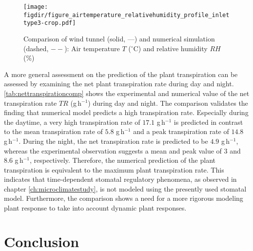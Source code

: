 \begin{figure}[t]
	\centering
	\texttt{[image: \\figdir/figure\_airtemperature\_relativehumidity\_profile\_inlettype3-crop.pdf]}
	\caption{Comparison of wind tunnel (solid, ---) and numerical simulation (dashed, $--$):  Air temperature $T$ ($^{\circ}$C) and  relative humidity $\mathit{RH}$ (\%)}
	\label{fig:figure_airtemperature_relativehumidity_profile2}
\end{figure}

A more general assessment on the prediction of the plant transpiration can be assessed by examining the net plant transpiration rate during day and night. \cref{tab:nettranspirationcomp} shows the experimental and numerical value of the net transpiration rate $\textit{TR}$ (g\,h$^{-1}$) during day and night. The comparison validates the finding that numerical model predicts a high transpiration rate. Especially during the daytime, a very high transpiration rate of $17.1$ g\,h$^{-1}$ is predicted in contrast to the mean transpiration rate of $5.8$ g\,h$^{-1}$ and a peak transpiration rate of $14.8$ g\,h$^{-1}$. During the night, the net transpiration rate is predicted to be $4.9$ g\,h$^{-1}$, whereas the experimental observation suggests a mean and peak value of $3$ and $8.6$ g\,h$^{-1}$, respectively. Therefore, the numerical prediction of the plant transpiration is equivalent to the maximum plant transpiration rate. This indicates that time-dependent stomatal regulatory phenomena, as observed in chapter \ref{ch:microclimatestudy}, is not modeled using the presently used stomatal model. Furthermore, the comparison shows a need for a more rigorous modeling plant response to take into account dynamic plant responses.


\section{Conclusion}

